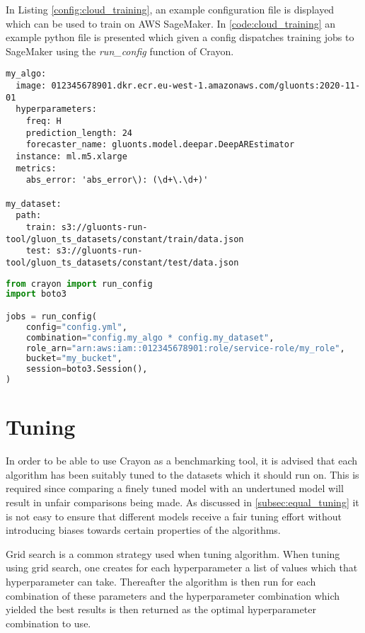 In Listing \ref{config:cloud_training}, an example configuration file is displayed which can be used to train on AWS SageMaker. In \ref{code:cloud_training} an example python file is presented which given a config dispatches training jobs to SageMaker using the \textit{run\_config} function of Crayon.

\begin{lstlisting}[label={config:cloud_training}, caption=Config file for running training jobs on SageMaker.]
my_algo:
  image: 012345678901.dkr.ecr.eu-west-1.amazonaws.com/gluonts:2020-11-01
  hyperparameters:
    freq: H
    prediction_length: 24
    forecaster_name: gluonts.model.deepar.DeepAREstimator 
  instance: ml.m5.xlarge 
  metrics:
    abs_error: 'abs_error\): (\d+\.\d+)'

my_dataset:
  path:
    train: s3://gluonts-run-tool/gluon_ts_datasets/constant/train/data.json
    test: s3://gluonts-run-tool/gluon_ts_datasets/constant/test/data.json

\end{lstlisting}
\begin{lstlisting}[language=Python, label={code:cloud_training}, caption=Code for running training jobs on AWS SageMaker using Crayon]
from crayon import run_config
import boto3

jobs = run_config(
    config="config.yml",
    combination="config.my_algo * config.my_dataset",
    role_arn="arn:aws:iam::012345678901:role/service-role/my_role",
    bucket="my_bucket",
    session=boto3.Session(),
)
\end{lstlisting}

\section{Tuning}
In order to be able to use Crayon as a benchmarking tool, it is advised that each algorithm has been suitably tuned to the datasets which it should run on. This is required since comparing a finely tuned model with an undertuned model will result in unfair comparisons being made. As discussed in \ref{subsec:equal_tuning} it is not easy to ensure that different models receive a fair tuning effort without introducing biases towards certain properties of the algorithms.

Grid search is a common strategy used when tuning algorithm. When tuning using grid search, one creates for each hyperparameter a list of values which that hyperparameter can take. Thereafter the algorithm is then run for each combination of these parameters and the hyperparameter combination which yielded the best results is then returned as the optimal hyperparameter combination to use.

